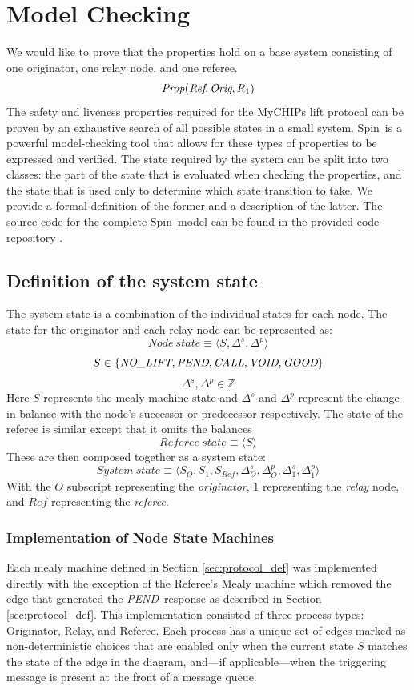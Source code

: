 \documentclass[runningheads]{llncs}
\newcommand{\nolift}{\emph{NO\_LIFT}}
\newcommand{\pend}{\emph{PEND}}
\newcommand{\call}{\emph{CALL}}
\newcommand{\void}{\emph{VOID}}
\newcommand{\good}{\emph{GOOD}}
\newcommand{\secref}[1]{Section \ref{#1}}
\newcommand{\spin}{Spin}
\newcommand{\coderepository}{provided code repository \cite{Storey_Extending_Model_Checking_2023}}
\newif\ifcomments
\newif\ifkylecomments
\newcommand{\egm}[1]{\ifcomments\textcolor{orange}{egm: #1}\fi}
\newcommand{\krs}[1]{\ifkylecomments\textcolor{blue}{krs: #1}\fi}
\begin{document}
\section{Model Checking} \label{chap:model_checking_results}
We would like to prove that the properties hold on a base system consisting of one originator, one relay node, and one referee.
$$
\mathit{Prop}(\emph{Ref}, \emph{Orig}, R_1)
$$
The safety and liveness properties required for the MyCHIPs lift protocol can be proven by an exhaustive search of all possible states in a small system. \spin\ is a powerful model-checking tool that allows for these types of properties to be expressed and verified. The state required by the system can be split into two classes: the part of the state that is evaluated when checking the properties, and the state that is used only to determine which state transition to take. We provide a formal definition of the former and a description of the latter. The source code for the complete \spin\ model can be found in the \coderepository.
\krs{Added a new command to make this consistent. \egm{Move the reference to the repository into a citation. Also, be consistent with how Spin is presented. Spin, spin, SPIN, etc. Pick one and be consistent.}}

\subsection{Definition of the system state}\label{sec:statedef}
The system state is a combination of the individual states for each node. The state for the originator and each relay node can be represented as:
$$\mathit{Node~state} \equiv \langle S, \Delta^s, \Delta^p \rangle$$
$$
S \in \{\nolift, \pend, \call, \void, \good\}
$$
$$
\Delta^s, \Delta^p \in \mathds{Z}
$$
Here $S$ represents the mealy machine state and $\Delta^s$ and $\Delta^p$ represent the change in balance with the node's successor or predecessor respectively.
The state of the referee is similar except that it omits the balances
$$\mathit{Referee~state} \equiv \langle S \rangle$$
These are then composed together as a system state:
$$\mathit{System~state} \equiv \langle S_O, S_1, S_{\mathit{Ref}}, \Delta^s_O, \Delta^p_O, \Delta^s_1, \Delta^p_1 \rangle$$
With the $O$ subscript representing the \emph{originator}, $1$ representing the \emph{relay} node, and $\mathit{Ref}$ representing the \emph{referee}.

\subsubsection{Implementation of Node State Machines} 
Each mealy machine defined in \secref{sec:protocol_def} was implemented directly with the exception of the Referee's Mealy machine which removed the edge that generated the \pend\ response as described in \secref{sec:protocol_def}. This implementation consisted of three process types: Originator, Relay, and Referee. Each process has a unique set of edges marked as non-deterministic choices that are enabled only when the current state $S$ matches the state of the edge in the diagram, and---if applicable---when the triggering message is present at the front of a message queue.
\end{document}
